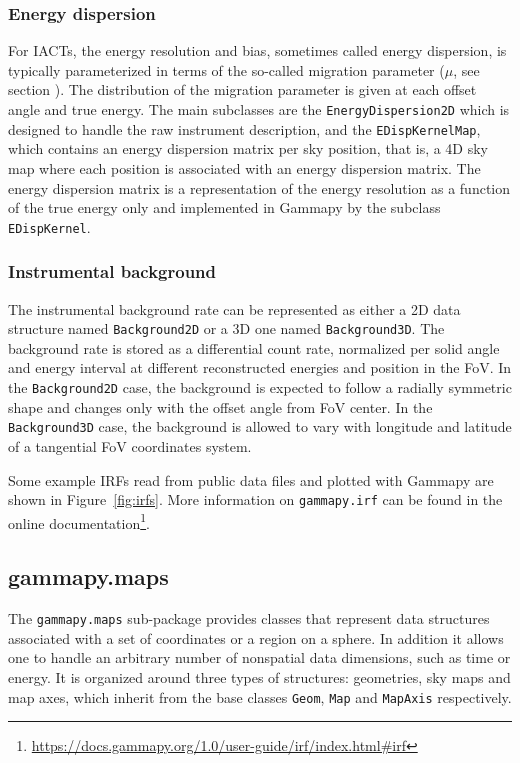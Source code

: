 \documentclass[longauth]{aa}
\newcommand{\code}[1]{\texttt{#1}}
\newcommand{\gammapy}{Gammapy\xspace}
\newcommand{\iacts}{IACTs\xspace}
\begin{document}
\subsubsection{Energy dispersion}
For \iacts, the energy resolution and bias, sometimes called energy dispersion,
is typically parameterized in terms of the so-called
migration parameter ($\mu$, see section \label{sec:gammaray-data-analysis}).
The distribution of the migration parameter is given at each offset angle and
true energy. The main subclasses are the \code{EnergyDispersion2D} which is
designed to handle the raw instrument description, and the \code{EDispKernelMap},
which contains an energy dispersion matrix per sky position, that is, a 4D
sky map where each position is associated with an energy dispersion matrix.
The energy dispersion matrix is a representation of the energy resolution
as a function of the true energy only and implemented in \gammapy
by the subclass \code{EDispKernel}.

\subsubsection{Instrumental background}
The instrumental background rate can be represented as either a 2D
data structure named \code{Background2D} or a 3D one named \code{Background3D}.
The background rate is stored as a differential count rate, normalized per solid angle
and energy interval at different reconstructed energies and position in the FoV.
In the \code{Background2D} case, the background is expected to follow a radially symmetric shape
and changes only with the offset angle from FoV center.
In the \code{Background3D} case, the background is allowed to vary with 
longitude and latitude of a tangential FoV coordinates system.

Some example IRFs read from public data files and plotted with \gammapy are shown 
in Figure~\ref{fig:irfs}. More information on \code{gammapy.irf} can be found 
in the online documentation\footnote{\url{https://docs.gammapy.org/1.0/user-guide/irf/index.html\#irf}}.

\subsection{gammapy.maps}
\label{ssec:gammapy-maps}
The \code{gammapy.maps} sub-package provides classes that represent data
structures associated with a set of coordinates or a region on a sphere. In
addition it allows one to handle an arbitrary number of nonspatial data
dimensions, such as time or energy. It is organized around three types of
structures: geometries, sky maps and map axes, which inherit from the base
classes \code{Geom}, \code{Map} and \code{MapAxis} respectively.
\end{document}
